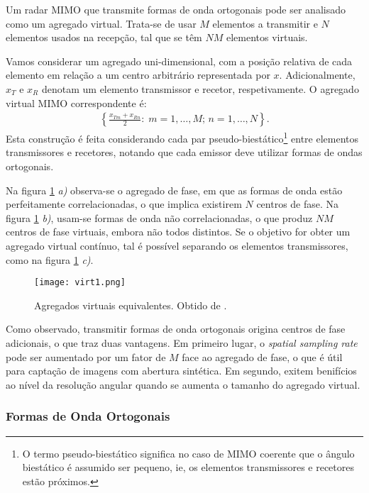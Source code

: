 \documentclass[purist,portuguese]{ist-report}
\begin{document}
Um radar MIMO que transmite formas de onda ortogonais pode ser analisado como um agregado virtual.
Trata-se de usar $M$ elementos a transmitir e $N$ elementos usados na recepção, tal que se têm $NM$ elementos virtuais.

Vamos considerar um agregado uni-dimensional, com a posição relativa de cada elemento em relação a um centro arbitrário representada por $x$. 
Adicionalmente, $x_T$ e $x_R$ denotam um elemento transmissor e recetor, respetivamente.
O agregado virtual MIMO correspondente é:
\begin{align}
  \left\{ \frac{x_{Tm}+x_{Rn}}{2}:\; m=1,\ldots,M;\,n=1,\ldots,N \right\}.
  \label{eq:virtualmimo}
\end{align}
Esta construção é feita considerando cada par pseudo-biestático\footnote{O termo pseudo-biestático significa no caso de MIMO coerente que o ângulo biestático é assumido ser pequeno, ie, os elementos transmissores e recetores estão próximos.} entre elementos transmissores e recetores, notando que cada emissor deve utilizar formas de ondas ortogonais.

Na figura \ref{fig:virt1} \emph{a)} observa-se o agregado de fase, em que as formas de onda estão perfeitamente correlacionadas, o que implica existirem $N$ centros de fase.
Na figura \ref{fig:virt1} \emph{b)}, usam-se formas de onda não correlacionadas, o que produz $NM$ centros de fase virtuais, embora não todos distintos.
Se o objetivo for obter um agregado virtual contínuo, tal é possível separando os elementos transmissores, como na figura \ref{fig:virt1} \emph{c)}. 

\begin{figure}[h]
  \centering
  \texttt{[image: virt1.png]}
  \caption{Agregados virtuais equivalentes. Obtido de \cite{davis2015mimo}.}
  \label{fig:virt1}
\end{figure}

Como observado, transmitir formas de onda ortogonais origina centros de fase adicionais, o que traz duas vantagens.
Em primeiro lugar, o \textit{spatial sampling rate} pode ser aumentado por um fator de $M$ face ao agregado de fase, o que é útil para captação de imagens com abertura sintética.
Em segundo, exitem benifícios ao nível da resolução angular quando se aumenta o tamanho do agregado virtual.

\subsubsection{Formas de Onda Ortogonais}
\end{document}
